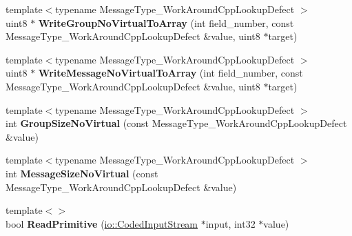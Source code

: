 \begin{DoxyCompactItemize}
{\footnotesize template$<$typename Message\+Type\+\_\+\+Work\+Around\+Cpp\+Lookup\+Defect $>$ }\\uint8 $\ast$ {\bfseries Write\+Group\+No\+Virtual\+To\+Array} (int field\+\_\+number, const Message\+Type\+\_\+\+Work\+Around\+Cpp\+Lookup\+Defect \&value, uint8 $\ast$target)
\item 
\mbox{\label{classgoogle_1_1protobuf_1_1internal_1_1WireFormatLite_a645adaefa878f3e7646cb78d3d8457e1}} 
{\footnotesize template$<$typename Message\+Type\+\_\+\+Work\+Around\+Cpp\+Lookup\+Defect $>$ }\\uint8 $\ast$ {\bfseries Write\+Message\+No\+Virtual\+To\+Array} (int field\+\_\+number, const Message\+Type\+\_\+\+Work\+Around\+Cpp\+Lookup\+Defect \&value, uint8 $\ast$target)
\item 
\mbox{\label{classgoogle_1_1protobuf_1_1internal_1_1WireFormatLite_af3c5a5e1404821199abd7d7f336a287f}} 
{\footnotesize template$<$typename Message\+Type\+\_\+\+Work\+Around\+Cpp\+Lookup\+Defect $>$ }\\int {\bfseries Group\+Size\+No\+Virtual} (const Message\+Type\+\_\+\+Work\+Around\+Cpp\+Lookup\+Defect \&value)
\item 
\mbox{\label{classgoogle_1_1protobuf_1_1internal_1_1WireFormatLite_af4284dc31a104dda300a3fbc7bb0099f}} 
{\footnotesize template$<$typename Message\+Type\+\_\+\+Work\+Around\+Cpp\+Lookup\+Defect $>$ }\\int {\bfseries Message\+Size\+No\+Virtual} (const Message\+Type\+\_\+\+Work\+Around\+Cpp\+Lookup\+Defect \&value)
\item 
\mbox{\label{classgoogle_1_1protobuf_1_1internal_1_1WireFormatLite_ad937cb6f432cd24810e1c9446b2fd328}} 
{\footnotesize template$<$$>$ }\\bool {\bfseries Read\+Primitive} (\hyperlink{classgoogle_1_1protobuf_1_1io_1_1CodedInputStream}{io\+::\+Coded\+Input\+Stream} $\ast$input, int32 $\ast$value)
\item 
\mbox{\label{classgoogle_1_1protobuf_1_1internal_1_1WireFormatLite_a2b403f70285933949254f6150098e4e4}} 

\end{DoxyCompactItemize}
